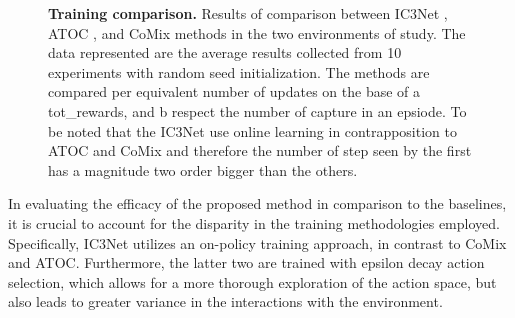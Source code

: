 \documentclass[a4paper,singleside,12pt]{report} %
\begin{document}
\begin{figure}
  \centering
  \hfill
  \caption{\textbf{Training comparison.} Results of comparison between IC3Net \cite{IC3NETSingh2018LearningWT}, ATOC \cite{ATOCJiang2018LearningAC}, and CoMix methods in the two environments of study. The data represented are the average results collected from 10 experiments with random seed initialization. The methods are compared per equivalent number of updates on the base of a tot_rewards, and b respect the number of capture in an epsiode. To be noted that the IC3Net use online learning in contrapposition to ATOC and CoMix and therefore the number of step seen by the first has a magnitude two order bigger than the others.}
  \label{fig:training}
\end{figure}

In evaluating the efficacy of the proposed method in comparison to the baselines, it is crucial to account for the disparity in the training methodologies employed. Specifically, IC3Net utilizes an on-policy training approach, in contrast to CoMix and ATOC. Furthermore, the latter two are trained with epsilon decay action selection, which allows for a more thorough exploration of the action space, but also leads to greater variance in the interactions with the environment.
\end{document}
